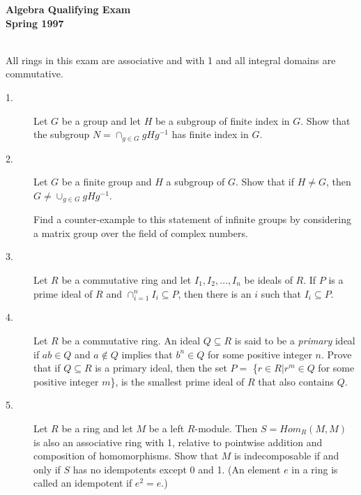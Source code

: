 \documentclass{article}
\begin{document}



\begin{center}\begin{LARGE}
{\bf Algebra Qualifying Exam}\\ 
{\bf Spring 1997}\\ \end{LARGE}
\end{center}
\vspace{0.1in}
\noindent\hrulefill\\
All rings in this exam are associative and with 1 and all integral domains
are commutative.

\begin{description}

\item[1.]
Let $G$ be a group and let $H$ be a subgroup of finite index in $G$. Show
that the subgroup $N = \cap_{g \in G} gHg^{-1}$ has finite index in $G$.

\item[2.]
Let $G$ be a finite group and $H$ a subgroup of $G$. Show that if
$H \neq G$, then $G \neq \cup_{g \in G} gHg^{-1}$.

Find a counter-example to this statement of infinite groups by considering
a matrix group over the field of complex numbers.

\item[3.]
Let $R$ be a commutative ring and let $I_1, I_2, \dots, I_n$ be ideals of
$R$. If $P$ is a prime ideal of $R$ and $\cap^n_{i=1} I_i \subseteq P$,
then there is an $i$ such that $I_i \subseteq P$.

\item[4.]
Let $R$ be a commutative ring. An ideal $Q \subseteq R$ is said to be a
{\it primary} ideal if $ab \in Q$ and $a \notin Q$ implies that
$b^n \in Q$ for some positive integer $n$. Prove that if $Q \subseteq R$
is a primary ideal, then the set $P =$ \{$r \in R| r^m \in Q$ for some
positive integer $m$\}, is the smallest prime ideal of $R$ that also
contains $Q$.

\item[5.]
Let $R$ be a ring and let $M$ be a left $R$-module. Then $S= Hom_R(M, M)$
is also an associative ring with 1, relative to pointwise addition and
composition of homomorphisms. Show that $M$ is indecomposable if and only
if $S$ has no idempotents except 0 and 1. (An element $e$ in a ring is
called an idempotent if $e^2 =e$.)


\end{description}
\end{document}
